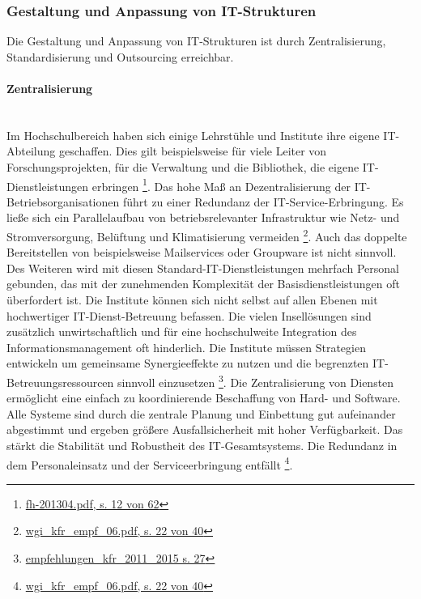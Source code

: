 \documentclass[a4paper, 12pt]{scrreprt}
\begin{document}
\subsubsection{Gestaltung und Anpassung von IT-Strukturen}
Die Gestaltung und Anpassung von IT-Strukturen ist durch Zentralisierung, Standardisierung und Outsourcing erreichbar.


\paragraph{Zentralisierung}\mbox{}\\
Im Hochschulbereich haben sich einige Lehrstühle und Institute ihre eigene IT-Abteilung geschaffen. Dies gilt beispielsweise für viele Leiter von Forschungsprojekten, für die Verwaltung und die Bibliothek, die eigene IT-Dienstleistungen erbringen \footnote{\url{fh-201304.pdf, s. 12 von 62}}. Das hohe Maß an Dezentralisierung der IT-Betriebsorganisationen führt zu einer Redundanz der IT-Service-Erbringung. Es ließe sich ein Parallelaufbau von betriebsrelevanter Infrastruktur wie Netz- und Stromversorgung, Belüftung und Klimatisierung vermeiden \footnote{\url{wgi_kfr_empf_06.pdf, s. 22 von 40}}. Auch das doppelte Bereitstellen von beispielsweise Mailservices oder Groupware ist nicht sinnvoll. Des Weiteren wird mit diesen Standard-IT-Dienstleistungen mehrfach Personal gebunden, das mit der zunehmenden Komplexität der Basisdienstleistungen oft überfordert ist. 
Die Institute können sich nicht selbst auf allen Ebenen mit hochwertiger IT-Dienst-Betreuung befassen. Die vielen Insellösungen sind zusätzlich unwirtschaftlich und für eine hochschulweite Integration des Informationsmanagement oft hinderlich. Die Institute müssen Strategien entwickeln um gemeinsame Synergieeffekte zu nutzen und die begrenzten IT-Betreuungsressourcen sinnvoll einzusetzen \footnote{\url{empfehlungen_kfr_2011_2015 s. 27}}.
Die Zentralisierung von Diensten ermöglicht eine einfach zu koordinierende Beschaffung von Hard- und Software. Alle Systeme sind durch die zentrale Planung und Einbettung gut aufeinander abgestimmt und ergeben größere Ausfallsicherheit mit hoher Verfügbarkeit. Das stärkt die Stabilität und Robustheit des IT-Gesamtsystems. Die Redundanz in dem Personaleinsatz und der Serviceerbringung entfällt \footnote{\url{wgi_kfr_empf_06.pdf, s. 22 von 40}}. 
\end{document}
